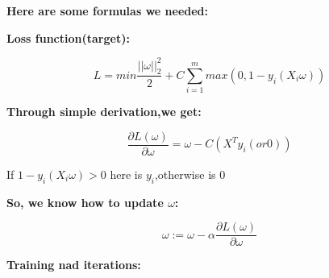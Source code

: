 \documentclass[11pt,a3paper]{article}
\begin{document}
    \textbf{Here are some formulas we needed:}

    \textbf{Loss function(target):}

    \[L=min\frac {||\omega||^2_2} 2+C \sum_{i=1}^m{max(0,1-y_i(X_i\omega))}\]

    \textbf{Through simple derivation,we get:}

    \[\frac{\partial L(\omega)} {\partial \omega}=\omega-C(X^Ty_i(or   0))\]

    {If \(1-y_i(X_i\omega)>0\) here is \(y_i\),otherwise is 0}

    \textbf{So, we know how to update \(\omega\):}

    \[\omega:=\omega-\alpha\frac{\partial L(\omega)} {\partial \omega}\]

    \textbf{Training nad iterations:}
\end{document}
